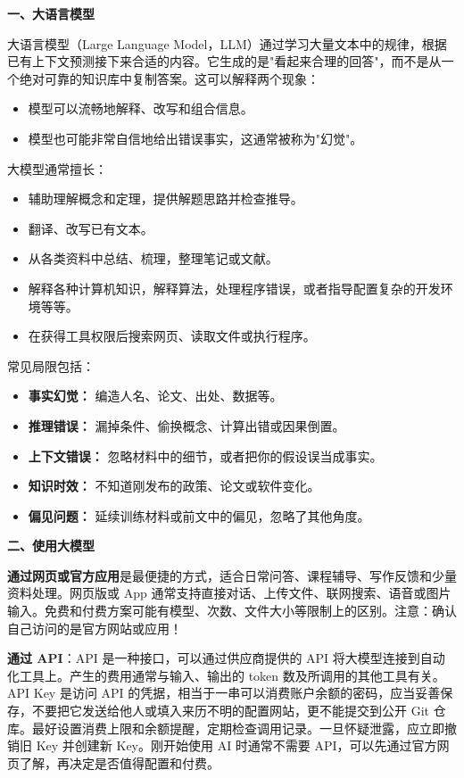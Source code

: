 \documentclass[11pt,oneside]{book}
\begin{document}
\textbf{一、大语言模型}

大语言模型（Large Language Model，LLM）通过学习大量文本中的规律，根据已有上下文预测接下来合适的内容。它生成的是"看起来合理的回答"，而不是从一个绝对可靠的知识库中复制答案。这可以解释两个现象：

\begin{itemize}
    \item 模型可以流畅地解释、改写和组合信息。
    \item 模型也可能非常自信地给出错误事实，这通常被称为"幻觉"。
\end{itemize}

大模型通常擅长：

\begin{itemize}
    \item 辅助理解概念和定理，提供解题思路并检查推导。
    \item 翻译、改写已有文本。
    \item 从各类资料中总结、梳理，整理笔记或文献。
    \item 解释各种计算机知识，解释算法，处理程序错误，或者指导配置复杂的开发环境等等。
    \item 在获得工具权限后搜索网页、读取文件或执行程序。
\end{itemize}

常见局限包括：

\begin{itemize}
    \item \textbf{事实幻觉：} 编造人名、论文、出处、数据等。
    \item \textbf{推理错误：} 漏掉条件、偷换概念、计算出错或因果倒置。
    \item \textbf{上下文错误：} 忽略材料中的细节，或者把你的假设误当成事实。
    \item \textbf{知识时效：} 不知道刚发布的政策、论文或软件变化。
    \item \textbf{偏见问题：} 延续训练材料或前文中的偏见，忽略了其他角度。
\end{itemize}

\vspace{10pt}

\textbf{二、使用大模型}

\textbf{通过网页或官方应用}是最便捷的方式，适合日常问答、课程辅导、写作反馈和少量资料处理。网页版或 App 通常支持直接对话、上传文件、联网搜索、语音或图片输入。免费和付费方案可能有模型、次数、文件大小等限制上的区别。注意：确认自己访问的是官方网站或应用！

\textbf{通过 API}：API 是一种接口，可以通过供应商提供的 API 将大模型连接到自动化工具上。产生的费用通常与输入、输出的 token 数及所调用的其他工具有关。API Key 是访问 API 的凭据，相当于一串可以消费账户余额的密码，应当妥善保存，不要把它发送给他人或填入来历不明的配置网站，更不能提交到公开 Git 仓库。最好设置消费上限和余额提醒，定期检查调用记录。一旦怀疑泄露，应立即撤销旧 Key 并创建新 Key。刚开始使用 AI 时通常不需要 API，可以先通过官方网页了解，再决定是否值得配置和付费。
\end{document}
